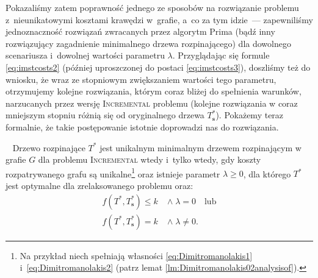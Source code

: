 Pokazaliśmy zatem poprawność jednego ze sposobów na rozwiązanie problemu z~nieunikatowymi kosztami krawędzi w~grafie, a~co za tym idzie~--- zapewniliśmy jednoznaczność rozwiązań zwracanych przez algorytm Prima (bądź inny rozwiązujący zagadnienie minimalnego drzewa rozpinającego) dla dowolnego scenariusza i~dowolnej wartości parametru $\lambda$.
Przyglądając się formule \ref{eq:imstcosts2} (później uproszczonej do postaci \ref{eq:imstcosts3}), doszliśmy też do wniosku, że wraz ze stopniowym zwiększaniem wartości tego parametru, otrzymujemy kolejne rozwiązania, którym coraz bliżej do spełnienia warunków, narzucanych przez wersję \textsc{Incremental} problemu (kolejne rozwiązania w coraz mniejszym stopniu różnią się od oryginalnego drzewa $T^{\ast}_{\textbf{s}}$).
Pokażemy teraz formalnie, że takie postępowanie istotnie doprowadzi nas do rozwiązania.

\begin{theorem}~\cite[$589$]{incNetOpt}\label{th:incNetOpt}
	Drzewo rozpinające $T^{\ast}$ jest unikalnym minimalnym drzewem rozpinającym w grafie $G$ dla problemu \textsc{Incremental} wtedy i~tylko wtedy, gdy koszty rozpatrywanego grafu są unikalne\footnote{
		Na przykład niech spełniają własności \ref{eq:Dimitromanolakis1} i~\ref{eq:Dimitromanolakis2} (patrz lemat \ref{lm:Dimitromanolakis02analysisof}).
	} oraz istnieje parametr $\lambda \geqslant 0$, dla którego $T^{\ast}$ jest optymalne dla zrelaksowanego problemu oraz:
	\begin{align}
		f \left( T^{\ast}, T^{\ast}_{\textbf{s}} \right) \leqslant k \; & \wedge \; \lambda = 0 \quad \text{lub}\label{eq:imstoptcond3}\\
		f \left( T^{\ast}, T^{\ast}_{\textbf{s}} \right) = k \; & \wedge \; \lambda \neq 0\text{.}\label{eq:imstoptcond4}
	\end{align}
\end{theorem}

